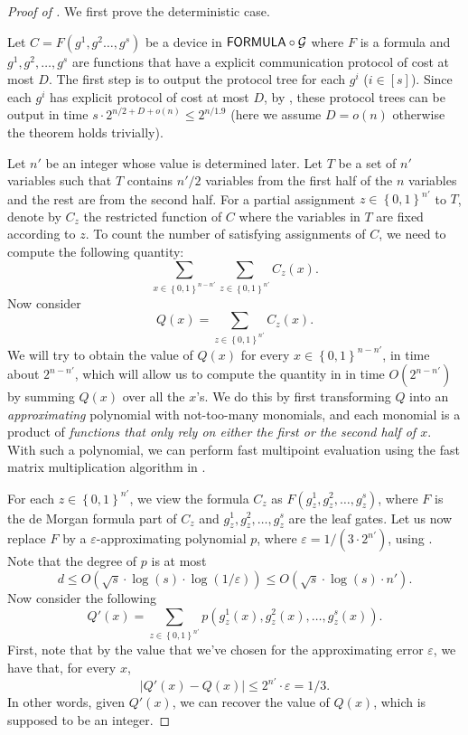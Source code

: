 \documentclass[10pt,a4paper]{article}
\newcommand{\bool}{\left\{0,1\right\}}
\newcommand{\FORMULA}{{\sf FORMULA}}
\begin{document}
	\begin{proof}[Proof of ]
    	We first prove the deterministic case.
    	
    	Let $C=F(g^1,g^2\dots,g^s)$ be a device in $\FORMULA\circ\mathcal{G}$ where $F$ is a formula and $g^1,g^2,\dots,g^s$ are functions that have a explicit communication protocol of cost at most $D$.
        The first step is to output the protocol tree for each $g^i$ ($i\in[s]$). Since each $g^i$ has explicit protocol of cost at most $D$, by , these protocol trees can be output in time $s\cdot 2^{n/2+D+o(n)}\leq 2^{n/1.9}$ (here we assume $D = o(n)$ otherwise the theorem holds trivially).
    
    	Let $n'$ be an integer whose value is determined later. Let $T$ be a set of $n'$ variables such that $T$ contains $n'/2$ variables from the first half of the $n$ variables and the rest are from the second half. For a partial assignment $z\in\bool^{n'}$ to $T$, denote by $C_z$ the restricted function of $C$ where the variables in $T$ are fixed according to $z$. To count the number of satisfying assignments of $C$, we need to compute the following quantity:
		\begin{equation}\label{eq:sat-1}
			\sum_{x\in\bool^{n-n'}} \sum_{z\in\bool^{n'}} C_z(x).
		\end{equation}
		Now consider
		\[
			Q(x) = \sum_{z\in\bool^{n'}} C_z(x).
		\]
		We will try to obtain the value of $Q(x)$ for every $x\in\bool^{n-n'}$, in time about $2^{n-n'}$, which will allow us to compute the quantity in  in time $O(2^{n-n'})$ by summing $Q(x)$ over all the $x$'s. We do this by first transforming $Q$ into an \emph{approximating} polynomial with not-too-many monomials, and each monomial is a product of \emph{functions that only rely on either the first or the second half of $x$}. With such a polynomial, we can perform fast multipoint evaluation using the fast matrix multiplication algorithm in .

		For each $z\in\bool^{n'}$, we view the formula $C_z$ as $F(g^1_z,g^2_z,\dots,g^s_z)$, where $F$ is the de Morgan formula part of $C_z$ and $g^1_z,g^2_z,\dots,g^s_z$ are the leaf gates. Let us now replace $F$ by a $\varepsilon$-approximating polynomial $p$, where $\varepsilon = 1/\left(3\cdot 2^{n'}\right)$, using . Note that the degree of $p$ is at most 
		\[
		    d\leq O(\sqrt{s}\cdot\log(s)\cdot\log(1/\varepsilon))\leq O(\sqrt{s}\cdot\log(s)\cdot n').
		\]
		Now consider the following
		\[
			Q'(x)= \sum_{z\in\bool^{n'}} p(g^1_z(x),g^2_z(x),\dots,g^s_z(x)).
		\]
		First, note that by the value that we've chosen for the approximating error $\varepsilon$, we have that, for every $x$,
		\[
			\left|Q'(x)-Q(x)\right|\leq 2^{n'}\cdot \varepsilon= 1/3.
		\]
		In other words, given $Q'(x)$, we can recover the value of $Q(x)$, which is supposed to be an integer.


\end{proof}
\end{document}

